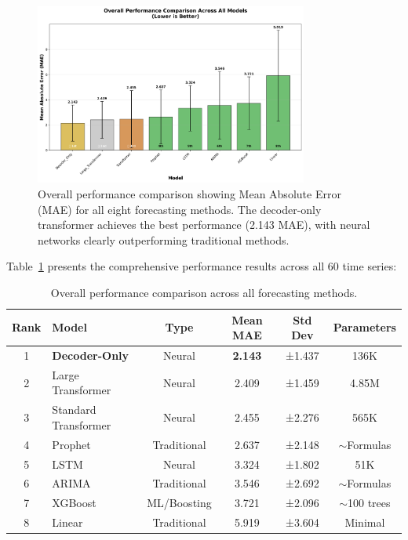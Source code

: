 \documentclass[11pt]{article}
\begin{document}
\begin{figure}[h]
\centering
\includegraphics[width=0.8\textwidth]{results/figure1_overall_performance.png}
\caption{Overall performance comparison showing Mean Absolute Error (MAE) for all eight forecasting methods. The decoder-only transformer achieves the best performance (2.143 MAE), with neural networks clearly outperforming traditional methods.}
\label{fig:overall_performance}
\end{figure}

Table~\ref{tab:overall_results} presents the comprehensive performance results across all 60 time series:

\begin{table}[h]
\centering
\begin{tabular}{@{}clcccc@{}}
\toprule
Rank & Model & Type & Mean MAE & Std Dev & Parameters \\
\midrule
1 & \textbf{Decoder-Only} & Neural & \textbf{2.143} & ±1.437 & 136K \\
2 & Large Transformer & Neural & 2.409 & ±1.459 & 4.85M \\
3 & Standard Transformer & Neural & 2.455 & ±2.276 & 565K \\
4 & Prophet & Traditional & 2.637 & ±2.148 & $\sim$Formulas \\
5 & LSTM & Neural & 3.324 & ±1.802 & 51K \\
6 & ARIMA & Traditional & 3.546 & ±2.692 & $\sim$Formulas \\
7 & XGBoost & ML/Boosting & 3.721 & ±2.096 & $\sim$100 trees \\
8 & Linear & Traditional & 5.919 & ±3.604 & Minimal \\
\bottomrule
\end{tabular}
\caption{Overall performance comparison across all forecasting methods.}
\label{tab:overall_results}
\end{table}
\end{document}
